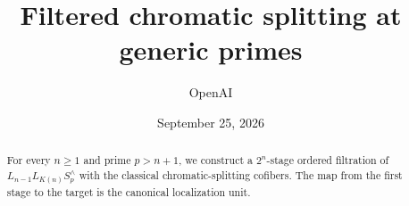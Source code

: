 \documentclass[11pt]{article}
\title{Filtered chromatic splitting at generic primes}
\author{OpenAI}
\date{September 25, 2026}
\begin{document}
\maketitle
\begin{abstract}
For every \(n\geq1\) and prime \(p>n+1\), we construct a
\(2^n\)-stage ordered filtration of \(L_{n-1}L_{K(n)}S_p^\wedge\) with the
classical chromatic-splitting cofibers. The map from the first stage to
the target is the canonical localization unit.
\end{abstract}
\tableofcontents
\clearpage














\end{document}
